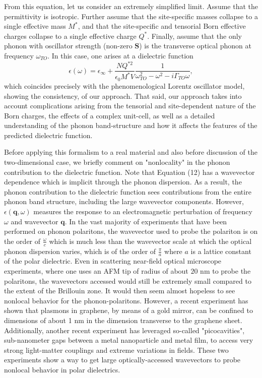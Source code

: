 \documentclass[superscriptaddress,reprint,prb]{revtex4-1}
\begin{document}
From this equation, let us consider an extremely simplified limit. Assume that the permittivity is isotropic. Further assume that the site-specific masses collapse to a single effective mass $M^*$, and that the site-specific and tensorial Born effective charges collapse to a single effective charge $Q^*$. Finally, assume that the only phonon with oscillator strength (non-zero $\mathbf{S}$) is the transverse optical phonon at frequency $\omega_{TO}$. In this case, one arises at a dielectric function 
\begin{equation}
\epsilon(\omega) = \epsilon_{\infty} + \frac{NQ^{*2}}{\epsilon_0 M^*V}\frac{1}{\omega^2_{TO}-\omega^2-i\Gamma_{TO}\omega},
\end{equation}
which coincides precisely with the phenomenological Lorentz oscillator model, showing the consistency, of our approach. That said, our approach takes into account complications arising from the tensorial and site-dependent nature of the Born charges, the effects of a complex unit-cell, as well as a detailed understanding of the phonon band-structure and how it affects the features of the predicted dielectric function.

Before applying this formalism to a real material and also before discussion of the two-dimensional case, we briefly comment on "nonlocality" in the phonon contribution to the dielectric function. Note that Equation (12) has a wavevector dependence which is implicit through the phonon dispersion. As a result, the phonon contribution to the dielectric function sees contributions from the entire phonon band structure, including the large wavevector components. However, $\epsilon(\mathbf{q},\omega)$ measures the response to an electromagnetic perturbation of frequency $\omega$ and wavevector $\mathbf{q}$. In the vast majority of experiments that have been performed on phonon polaritons, the wavevector used to probe the polariton is on the order of $\frac{\omega}{c}$ which is much less than the wavevector scale at which the optical phonon dispersion varies, which is of the order of $\frac{\pi}{a}$ where $a$ is a lattice constant of the polar dielectric.  Even in scattering near-field optical microscope experiments, where one uses an AFM tip of radius of about $20$ nm to probe the polaritons, the wavevectors accessed would still be extremely small compared to the extent of the Brillouin zone. It would then seem almost hopeless to see nonlocal behavior for the phonon-polaritons. However, a recent experiment \cite{iranzo2018probing} has shown that plasmons in graphene, by means of a gold mirror, can be confined to dimensions of about 1 nm in the dimension transverse to the graphene sheet. Additionally, another recent experiment \cite{benz2016single} has leveraged so-called "picocavities", sub-nanometer gaps between a metal nanoparticle and metal film, to access very strong light-matter couplings and extreme variations in fields. These two experiments show a way to get large optically-accessed wavevectors to probe nonlocal behavior in polar dielectrics.
\end{document}
